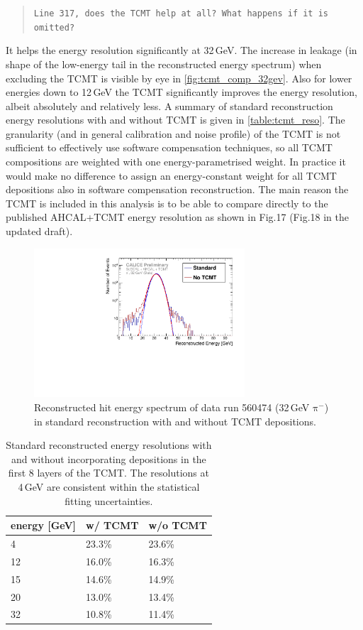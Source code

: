 \documentclass[twoside,a4paper,12pt]{article}
\newcommand\piminus{\(\mathrm{\pi^-}\)}
\begin{document}
\begin{quote}\texttt{Line 317, does the TCMT help at all?  What happens if it is omitted?}\end{quote}
It helps the energy resolution significantly at 32\,GeV. The increase in leakage (in shape of the low-energy tail in the reconstructed energy spectrum) when excluding the TCMT is visible by eye in \autoref{fig:tcmt_comp_32gev}. Also for lower energies down to 12\,GeV the TCMT significantly improves the energy resolution, albeit absolutely and relatively less. A summary of standard reconstruction energy resolutions with and without TCMT is given in \autoref{table:tcmt_reso}. The granularity (and in general calibration and noise profile) of the TCMT is not sufficient to effectively use software compensation techniques, so all TCMT compositions are weighted with one energy-parametrised weight. In practice it would make no difference to assign an energy-constant weight for all TCMT depositions also in software compensation reconstruction. The main reason the TCMT is included in this analysis is to be able to compare directly to the published AHCAL+TCMT energy resolution as shown in Fig.17 (Fig.18 in the updated draft).
\begin{figure}[htbp]
\begin{center}
\includegraphics[width=0.7\textwidth]{ERec_classic_noTCMT_560474_data}
\caption{Reconstructed hit energy spectrum of data run 560474 (32\,GeV \piminus) in standard reconstruction with and without TCMT depositions.}
\label{fig:tcmt_comp_32gev}
\end{center}
\end{figure}

\begin{table}[htbp]
\begin{center}
\caption{Standard reconstructed energy resolutions with and without incorporating depositions in the first 8 layers of the TCMT. The resolutions at 4\,GeV are consistent within the statistical fitting uncertainties.}
\label{table:tcmt_reso}
\begin{tabular}{lll}
energy [GeV]	&	w/ TCMT & w/o TCMT \\\hline
4		&23.3\%		& 23.6\% \\
12		&16.0\%		& 16.3\% \\
15		&14.6\%		& 14.9\% \\
20		&13.0\%		& 13.4\% \\
32		&10.8\%		& 11.4\% \\
\end{tabular}
\end{center}
\end{table}
\end{document}
